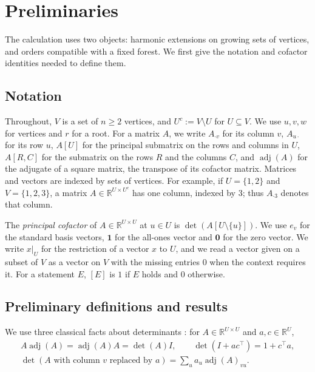 \documentclass[onefignum,onetabnum]{siamart250211}
\numberwithin{theorem}{section}
\numberwithin{equation}{section}
\newcommand{\R}{\mathbb{R}}
\newcommand{\one}{\mathbf{1}}
\newcommand{\zero}{\mathbf{0}}
\DeclareMathOperator{\adj}{adj}
\begin{document}
\section{Preliminaries}\label{sec:prelim}

The calculation uses two objects: harmonic extensions on growing
sets of vertices, and orders compatible with a fixed forest. We first
give the notation and cofactor identities needed to define them.


\subsection{Notation}\label{sec:notation}
Throughout, $V$ is a set of $n\ge2$ vertices, and
$U^c:=V\setminus U$ for $U\subseteq V$. We use $u,v,w$ for vertices
and $r$ for a root.
For a matrix $A$, we write $A_{\cdot v}$ for its column $v$, $A_{u\cdot}$ for its row $u$,
$A[U]$ for the principal submatrix on the rows and columns in $U$,
$A[R,C]$ for the submatrix on the rows $R$ and the columns $C$, and
$\adj(A)$ for the adjugate of a square matrix, the transpose of its
cofactor matrix. Matrices and vectors are indexed by sets of vertices.
For example, if $U=\{1,2\}$ and $V=\{1,2,3\}$, a matrix
$A\in\R^{U\times U^c}$ has one column, indexed by $3$; thus
$A_{\cdot3}$ denotes that column.


The \emph{principal cofactor} of $A\in\R^{U\times U}$
at $u\in U$ is $\det(A[U\setminus\{u\}])$. We use $e_v$ for the
standard basis vectors, $\one$ for the all-ones vector and $\zero$ for
the zero vector. We write $x|_U$ for the restriction of a vector $x$
to $U$, and we read a vector given on a subset of $V$ as a vector on
$V$ with the missing entries $0$ when the context requires it. For a statement $E$,
$[E]$ is $1$ if $E$ holds and $0$ otherwise.

\subsection{Preliminary definitions and results}\label{sec:preliminary-def}


We use three classical facts about determinants
\cite[\S\S0.8.2--0.8.5]{HornJohnson2013}: for $A\in\R^{U\times U}$ and
$a,c\in\R^U$,
\begin{equation}\label{eq:adj}
\begin{gathered}
A\adj(A)=\adj(A)A=\det(A)I,\qquad \det(I+ac^{\top})=1+c^{\top}a,\\
\det(A\text{ with column $v$ replaced by }a)=\textstyle\sum_u a_u\adj(A)_{vu}.
\end{gathered}
\end{equation}
\end{document}
